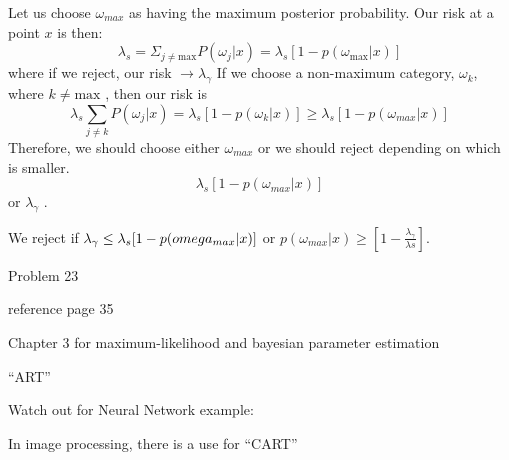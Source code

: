 \documentclass[11pt]{article}
\begin{document}
Let us choose $\omega_{max}$ as having the maximum posterior probability.  Our risk at a point $x$ is then:
\[ 
\lambda _s = \Sigma_{j \neq \textrm{max}} P( \omega_j | x) = \lambda_s [1 - p ( \omega_{\textrm{max}} |x)] 
\]
where if we reject, our risk $\to \lambda _\gamma$  If we choose a non-maximum category, $\omega_k$, where $k \neq \textrm{max}$ , then our risk is 
\[ 
	\lambda_s \sum _{j \neq k} P(\omega_j | x ) = \lambda_s [1 - p ( \omega_k | x)] \ge \lambda _s [1 - p ( \omega_{max} |x )]
\]
Therefore, we should choose either $\omega_{max}$ or we should reject depending on which is smaller.  
\[
\lambda_s [1 - p (\omega_{max} | x)] 
\]
or $\lambda_{\gamma}$ .

We reject if $\lambda_{\gamma} \le \lambda_s [1 - p (\\omega_{max} | x)]$  or $p(\omega_{max} | x) \ge [1 - \frac{\lambda_{\gamma}} {\lambda{s}}]$.


Problem 23

reference page 35   

Chapter 3 for maximum-likelihood and bayesian parameter estimation 

``ART'' 

Watch out for Neural Network example:   


In image processing, there is a use for ``CART''






\end{document}
